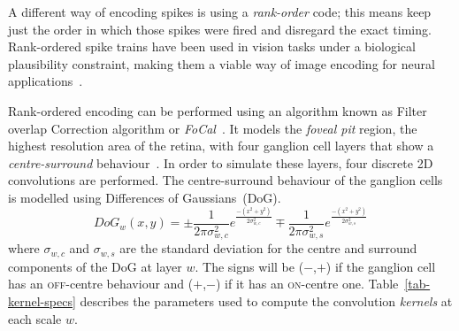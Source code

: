 A different way of encoding spikes is using a \emph{rank-order} code; this means
keep just the order in which those spikes were fired and disregard the exact timing. Rank-ordered spike trains have been used in vision tasks under a biological plausibility constraint, making them a viable way of image encoding for neural applications~\citep{van-rullen-rate-coding,basab-model,Masmoudi2010}.

Rank-ordered encoding can be performed using an algorithm known as 
{Filter overlap Correction algorithm} or \textit{FoCal}~\citep{basab-model}. It models the \emph{foveal pit} region, the highest resolution area of the retina, with four ganglion cell layers that show a \emph{centre-surround} behaviour~\citep{Kolb2003}. In order to simulate these layers, four discrete 2D convolutions are performed. The centre-surround behaviour of the ganglion cells is modelled using Differences of Gaussians~(DoG). 
\begin{equation}
\label{eq-dog}
DoG_w(x,y) = \pm\frac{1}{2\pi\sigma_{w,c}^2}e^{\frac{-(x^2 + y^2)}{2\sigma_{w,c}^2}}
\mp\frac{1}{2\pi\sigma_{w,s}^2}e^{\frac{-(x^2 + y^2)}{2\sigma_{w,s}^2}}
\end{equation}
where $\sigma_{w,c}$ and $\sigma_{w,s}$ are the standard deviation for the 
centre and surround components of the DoG at layer $w$. The signs 
will be ($-$,$+$) if the ganglion cell has an \textsc{off}-centre behaviour and 
($+$,$-$) if it has an \textsc{on}-centre one. Table~\ref{tab-kernel-specs} 
describes the parameters used to compute the convolution \emph{kernels} at each 
scale $w$.

